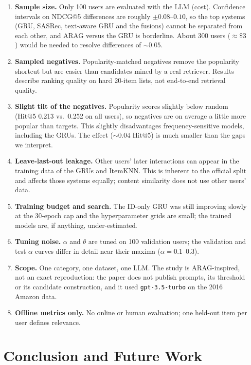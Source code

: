 \documentclass[11pt,a4paper]{article}
\begin{document}
\begin{enumerate}
  \item \textbf{Sample size.} Only 100 users are evaluated with the LLM (cost). Confidence intervals
  on NDCG@5 differences are roughly $\pm0.08$--$0.10$, so the top systems (GRU, SASRec,
  text-aware GRU and the fusions) cannot be separated from each other, and ARAG versus the GRU is
  borderline. About 300 users ($\approx\$3$)
  would be needed to resolve differences of $\sim0.05$.
  \item \textbf{Sampled negatives.} Popularity-matched negatives remove the popularity shortcut but
  are easier than candidates mined by a real retriever. Results describe ranking quality on hard
  20-item lists, not end-to-end retrieval quality.
  \item \textbf{Slight tilt of the negatives.} Popularity scores slightly below random (Hit@5 0.213
  vs.\ 0.252 on all users), so negatives are on average a little more popular than targets. This
  slightly disadvantages frequency-sensitive models, including the GRUs. The effect ($\sim0.04$
  Hit@5) is much smaller than the gaps we interpret.
  \item \textbf{Leave-last-out leakage.} Other users' later interactions can appear in the training
  data of the GRUs and ItemKNN. This is inherent to the official split and affects those systems
  equally; content similarity does not use other users' data.
  \item \textbf{Training budget and search.} The ID-only GRU was still improving slowly at the
  30-epoch cap and the hyperparameter grids are small; the trained models are, if anything,
  under-estimated.
  \item \textbf{Tuning noise.} $\alpha$ and $\theta$ are tuned on 100 validation users; the
  validation and test $\alpha$ curves differ in detail near their maxima ($\alpha=0.1$--$0.3$).
  \item \textbf{Scope.} One category, one dataset, one LLM. The study is ARAG-inspired, not an
  exact reproduction: the paper does not publish prompts, its threshold or its candidate
  construction, and it used \texttt{gpt-3.5-turbo} on the 2016 Amazon data.
  \item \textbf{Offline metrics only.} No online or human evaluation; one held-out item per user
  defines relevance.
\end{enumerate}

\section{Conclusion and Future Work}
\label{sec:conclusion}
\end{document}

